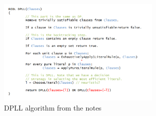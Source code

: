 \documentclass{article}
\begin{document}
\begin{enumerate}
					\begin{figure}[H]
					\centering
			 			\includegraphics[width=0.7\textwidth]{dpllalgo.png}
			 			\centering
			  			\caption{DPLL algorithm from the notes}
			  			\label{fig:dpllalgo}
					\end{figure}
		

\end{enumerate}
\end{document}
